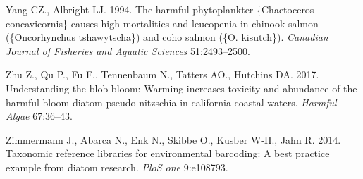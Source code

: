\documentclass[
]{article}
\begin{document}
\leavevmode\hypertarget{ref-yang1994harmful}{}%
Yang CZ., Albright LJ. 1994. The harmful phytoplankter \{Chaetoceros
concavicornis\} causes high mortalities and leucopenia in chinook salmon
(\{Oncorhynchus tshawytscha\}) and coho salmon (\{O. kisutch\}).
\emph{Canadian Journal of Fisheries and Aquatic Sciences} 51:2493--2500.

\leavevmode\hypertarget{ref-zhu2017understanding}{}%
Zhu Z., Qu P., Fu F., Tennenbaum N., Tatters AO., Hutchins DA. 2017.
Understanding the blob bloom: Warming increases toxicity and abundance
of the harmful bloom diatom pseudo-nitzschia in california coastal
waters. \emph{Harmful Algae} 67:36--43.

\leavevmode\hypertarget{ref-zimmermann2014taxonomic}{}%
Zimmermann J., Abarca N., Enk N., Skibbe O., Kusber W-H., Jahn R. 2014.
Taxonomic reference libraries for environmental barcoding: A best
practice example from diatom research. \emph{PloS one} 9:e108793.
\end{document}
